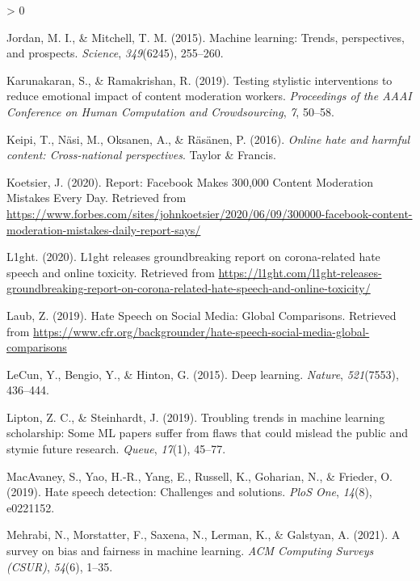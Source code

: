 \documentclass[
  10pt,
  dvipsnames,enabledeprecatedfontcommands]{scrartcl}
\newlength{\cslhangindent}
\newenvironment{CSLReferences}[2] %
 {%
  \setlength{\parindent}{0pt}
  \ifodd #1 \everypar{\setlength{\hangindent}{\cslhangindent}}\ignorespaces\fi
  \ifnum #2 > 0
  \setlength{\parskip}{#2\baselineskip}
  \fi
 }%
 {}
\begin{document}
\begin{CSLReferences}{1}{0}
\leavevmode\hypertarget{ref-jordan2015machine}{}%
Jordan, M. I., \& Mitchell, T. M. (2015). Machine learning: Trends,
perspectives, and prospects. \emph{Science}, \emph{349}(6245), 255--260.

\leavevmode\hypertarget{ref-karunakaran2019testing}{}%
Karunakaran, S., \& Ramakrishan, R. (2019). Testing stylistic
interventions to reduce emotional impact of content moderation workers.
\emph{Proceedings of the AAAI Conference on Human Computation and
Crowdsourcing}, \emph{7}, 50--58.

\leavevmode\hypertarget{ref-keipi2016online}{}%
Keipi, T., Näsi, M., Oksanen, A., \& Räsänen, P. (2016). \emph{Online
hate and harmful content: Cross-national perspectives}. Taylor \&
Francis.

\leavevmode\hypertarget{ref-koetsier_report}{}%
Koetsier, J. (2020). Report: {Facebook} {Makes} 300,000 {Content}
{Moderation} {Mistakes} {Every} {Day}. Retrieved from
\url{https://www.forbes.com/sites/johnkoetsier/2020/06/09/300000-facebook-content-moderation-mistakes-daily-report-says/}

\leavevmode\hypertarget{ref-noauthor_l1ght_2020}{}%
L1ght. (2020). L1ght releases groundbreaking report on corona-related
hate speech and online toxicity. Retrieved from
\url{https://l1ght.com/l1ght-releases-groundbreaking-report-on-corona-related-hate-speech-and-online-toxicity/}

\leavevmode\hypertarget{ref-Zachary_hate}{}%
Laub, Z. (2019). Hate {Speech} on {Social} {Media}: {Global}
{Comparisons}. Retrieved from
\url{https://www.cfr.org/backgrounder/hate-speech-social-media-global-comparisons}

\leavevmode\hypertarget{ref-lecun2015deep}{}%
LeCun, Y., Bengio, Y., \& Hinton, G. (2015). Deep learning.
\emph{Nature}, \emph{521}(7553), 436--444.

\leavevmode\hypertarget{ref-lipton2019troubling}{}%
Lipton, Z. C., \& Steinhardt, J. (2019). Troubling trends in machine
learning scholarship: Some ML papers suffer from flaws that could
mislead the public and stymie future research. \emph{Queue},
\emph{17}(1), 45--77.

\leavevmode\hypertarget{ref-macavaney2019hate}{}%
MacAvaney, S., Yao, H.-R., Yang, E., Russell, K., Goharian, N., \&
Frieder, O. (2019). Hate speech detection: Challenges and solutions.
\emph{PloS One}, \emph{14}(8), e0221152.

\leavevmode\hypertarget{ref-mehrabi2021survey}{}%
Mehrabi, N., Morstatter, F., Saxena, N., Lerman, K., \& Galstyan, A.
(2021). A survey on bias and fairness in machine learning. \emph{ACM
Computing Surveys (CSUR)}, \emph{54}(6), 1--35.


\end{CSLReferences}
\end{document}
